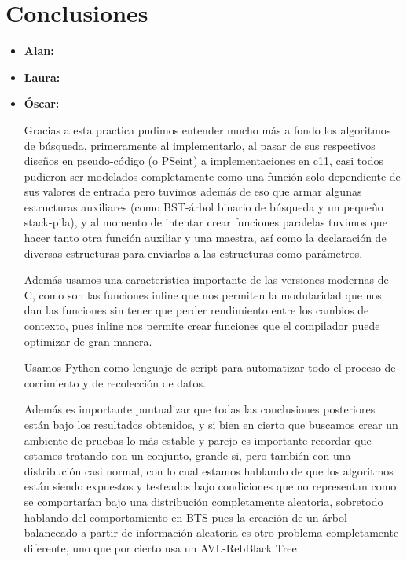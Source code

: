 \documentclass[12pt, fleqn]{article}                             %
\theoremstyle{break}                                            %
\begin{document}
\clearpage
\section{Conclusiones}

\begin{itemize}\setlength\itemsep{0em}

    \item \textbf{Alan:} 
    
    
    \item \textbf{Laura:} 
    
    
    \item \textbf{Óscar:} 
    
                Gracias a esta practica pudimos entender mucho más a fondo los algoritmos de búsqueda,
        primeramente al implementarlo, al pasar de sus respectivos 
        diseños en pseudo-código (o PSeint) a implementaciones en c11, casi todos pudieron ser
        modelados completamente como una función solo dependiente de sus valores de entrada
        pero tuvimos además de eso que armar algunas estructuras auxiliares (como BST-árbol
        binario de búsqueda y un pequeño stack-pila), y al momento de intentar crear funciones paralelas
        tuvimos que hacer tanto otra función auxiliar y una maestra, así como la declaración de diversas estructuras
        para enviarlas a las estructuras como parámetros.

        Además usamos una característica importante de las versiones modernas de C, como son las funciones
        inline que nos permiten la modularidad que nos dan las funciones
        sin tener que perder rendimiento entre los cambios de contexto, pues inline nos permite crear
        funciones que el compilador puede optimizar de gran manera.
        
        Usamos Python como lenguaje de script para automatizar todo el proceso de corrimiento y de recolección de datos.
        
        Además es importante puntualizar que todas las conclusiones posteriores están bajo los resultados obtenidos, y si bien en cierto que buscamos
        crear un ambiente de pruebas lo más estable y parejo es importante recordar que estamos tratando con un conjunto, grande si, pero también con
        una distribución casi normal, con lo cual estamos hablando de que los algoritmos están siendo expuestos y testeados bajo condiciones que no 
        representan como se comportarían bajo una distribución completamente aleatoria, sobretodo hablando del comportamiento en BTS pues la creación
        de un árbol balanceado a partir de información aleatoria es otro problema completamente diferente, uno que por cierto usa un AVL-RebBlack Tree
        

\end{itemize}
\end{document}
